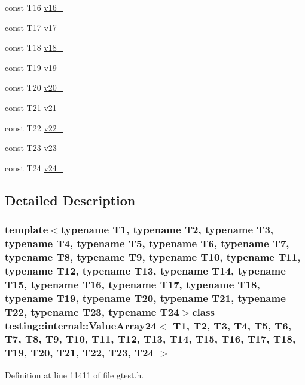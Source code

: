 \begin{DoxyCompactItemize}
\item 
const \-T16 \hyperlink{classtesting_1_1internal_1_1ValueArray24_a8b2b80d31925c1583c3e694d2bf235c5}{v16\-\_\-}
\item 
const \-T17 \hyperlink{classtesting_1_1internal_1_1ValueArray24_a9f59ea9e6f3642f77227dd1f7882d649}{v17\-\_\-}
\item 
const \-T18 \hyperlink{classtesting_1_1internal_1_1ValueArray24_ad07972ee98135c8deb090fc891a04e3e}{v18\-\_\-}
\item 
const \-T19 \hyperlink{classtesting_1_1internal_1_1ValueArray24_a3ad77b5b43c14332dabc9d47c8907e7f}{v19\-\_\-}
\item 
const \-T20 \hyperlink{classtesting_1_1internal_1_1ValueArray24_adb43992f7b5f5f07e0187003b8c9c872}{v20\-\_\-}
\item 
const \-T21 \hyperlink{classtesting_1_1internal_1_1ValueArray24_a80089b2eaa99efb5d3559378fbdac426}{v21\-\_\-}
\item 
const \-T22 \hyperlink{classtesting_1_1internal_1_1ValueArray24_aeec4c711a4f7cf166e6a2646aa7d0bc7}{v22\-\_\-}
\item 
const \-T23 \hyperlink{classtesting_1_1internal_1_1ValueArray24_a7f672a4a694f749a8b6119bff7705a66}{v23\-\_\-}
\item 
const \-T24 \hyperlink{classtesting_1_1internal_1_1ValueArray24_a6c10a180ac97815f7d3f4522507e91ca}{v24\-\_\-}
\end{DoxyCompactItemize}


\subsection{\-Detailed \-Description}
\subsubsection*{template$<$typename T1, typename T2, typename T3, typename T4, typename T5, typename T6, typename T7, typename T8, typename T9, typename T10, typename T11, typename T12, typename T13, typename T14, typename T15, typename T16, typename T17, typename T18, typename T19, typename T20, typename T21, typename T22, typename T23, typename T24$>$class testing\-::internal\-::\-Value\-Array24$<$ T1, T2, T3, T4, T5, T6, T7, T8, T9, T10, T11, T12, T13, T14, T15, T16, T17, T18, T19, T20, T21, T22, T23, T24 $>$}



\-Definition at line 11411 of file gtest.\-h.



